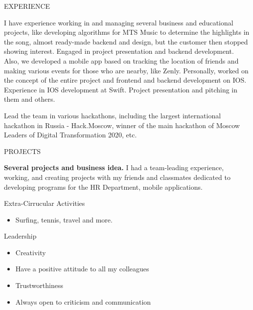 \documentclass{resume} %
\begin{document}
\begin{rSection}{EXPERIENCE}

I have experience working in and managing several business and educational projects, like developing algorithms for MTS Music to determine the highlights in the song, almost ready-made backend and design, but the customer then stopped showing interest. Engaged in project presentation and backend development. Also, we developed a mobile app based on tracking the location of friends and making various events for those who are nearby, like Zenly. Personally, worked on the concept of the entire project and frontend and backend development on IOS. Experience in IOS development at Swift. Project presentation and pitching in them and others.

Lead the team in various hackathons, including the largest international hackathon in Russia - Hack.Moscow, winner of the main hackathon of Moscow Leaders of Digital Transformation 2020, etc. 

\end{rSection} 


\begin{rSection}{PROJECTS}
\vspace{-1.25em}
\item \textbf{Several projects and business idea.} I had a team-leading experience, working, and creating projects with my friends and classmates dedicated to developing programs for the HR Department, mobile applications.
\end{rSection} 

\begin{rSection}{Extra-Cirrucular Activities} 
\begin{itemize}
    \item 	Surfing, tennis, travel and more.
\end{itemize}


\end{rSection}

\begin{rSection}{Leadership} 
\begin{itemize}
    \item Creativity
    \item Have a positive attitude to all my colleagues
    \item Trustworthiness
    \item Always open to criticism and communication
\end{itemize}


\end{rSection}
\end{document}

